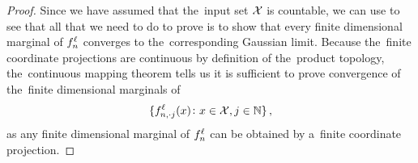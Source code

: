 \begin{proof}%
Since we have assumed that the~input set $\mathcal{X}$ is countable, we can use  to see that all that we need to do to prove  is to show that every finite dimensional marginal of $f_{n}^{\ell}$ converges to the~corresponding Gaussian limit.
Because the~finite coordinate projections are continuous by definition of the~product topology, the~continuous mapping theorem \citep[theorem~9.3.7]{dudley02} tells us it is sufficient to prove convergence of the~finite dimensional marginals of
\begin{equation}\label{eq:def_channels}
    \{
        {f}^{\ell}_{n, \cdot j}{(x)} \colon x \in \mathcal{X}, j \in \mathbb{N}
    \}
    \, ,
\end{equation}
as any finite dimensional marginal of $f_{n}^{\ell}$ can be obtained by a~finite coordinate projection.


\end{proof}
